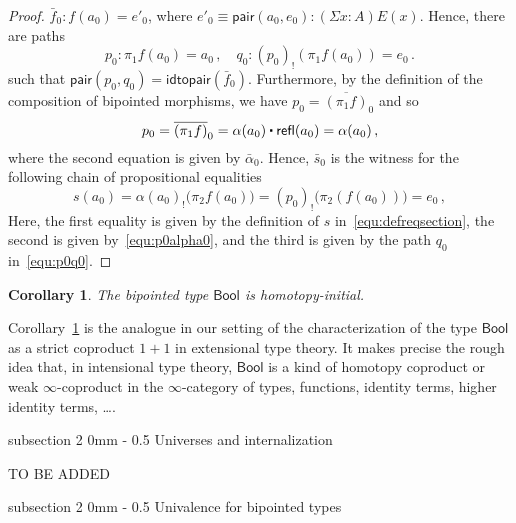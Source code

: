 \documentclass[reqno,10pt,a4paper,oneside]{amsart}
\makeatletter
\numberwithin{equation}{section}
\renewcommand{\subsection}{\@startsection
  {subsection}%
  {2}%
  {0mm}%
  {-\baselineskip}%
  {0.5\baselineskip}%
  {\normalfont\normalsize\bf}}%
\theoremstyle{mythm}
\newtheorem{corollary}[theorem]{Corollary}
\theoremstyle{mydef}
\theoremstyle{myrmk}
\newcommand{\peq}{=}
\newcommand{\co}{\colon}
\newcommand{\ct}{%
  \mathchoice{\mathbin{\raisebox{0.5ex}{$\displaystyle\centerdot$}}}%
             {\mathbin{\raisebox{0.5ex}{$\centerdot$}}}%
             {\mathbin{\raisebox{0.25ex}{$\scriptstyle\,\centerdot\,$}}}%
             {\mathbin{\raisebox{0.1ex}{$\scriptscriptstyle\,\centerdot\,$}}}}
\newcommand{\pair}{\mathsf{pair}}
\newcommand{\refl}{\mathsf{refl}}
\newcommand{\Bool}{\mathsf{Bool}}
\makeatother
\begin{document}
\begin{proof}
$\bar{f}_0 \co f(a_0) \peq e'_0$, where $e'_0 \equiv \pair(a_0, e_0) \co (\Sigma x :A ) E(x)$. Hence, there are paths 
\begin{equation}
\label{equ:p0q0}
p_0 \co \pi_1 f (a_0) \peq a_0 \, , \quad q_0 \co (p_0)_{!}( \pi_1 f (a_0)) \peq e_0 \, . 
\end{equation}
such that $\pair(p_0, q_0) \peq \mathsf{idtopair}(\bar{f}_0)$. Furthermore, by the definition of the composition of bipointed morphisms, we have
$p_0 =  \overline{(\pi_1 f)}_0$ and so
\begin{equation}
\label{equ:p0alpha0}
p_0 = \overline{(\pi_1 f)}_0 =  \alpha(a_0) \ct \refl(a_0)  = \alpha(a_0) \, ,
\end{equation}
where the second equation is given by $\bar{\alpha}_0$. Hence, $\bar{s}_0$ is the witness for the following chain of propositional equalities
\[
s(a_0) \peq \alpha(a_0)_{!} \big( \pi_2 f(a_0)  \big)  
              \peq  (  p_0   )_{!} \big( \pi_2(f(a_0) ) \big) 
               \peq  e_0 \, ,
\]
Here, the first equality is given by the definition of $s$ in~\eqref{equ:defreqsection}, the second is given by~\eqref{equ:p0alpha0}, and the third is given by the path $q_0$ in~\eqref{equ:p0q0}.
\end{proof}


\begin{corollary}\label{lem:BoolInitInt}
The bipointed type $\Bool$ is homotopy-initial.
\end{corollary}


Corollary~\ref{lem:BoolInitInt} is the analogue in our setting of the characterization of 
the type $\Bool$ as a strict coproduct $1+1$ in extensional type theory. It makes precise the rough idea that, 
in intensional type theory, $\Bool$ is a kind of homotopy coproduct or weak $\infty$-coproduct 
in the $\infty$-category of types, functions, identity terms, higher identity terms, \ldots.  


\subsection{Universes and internalization}

\vspace{3cm}

TO BE ADDED

\vspace{3cm}



\subsection{Univalence for bipointed types} 
\end{document}
